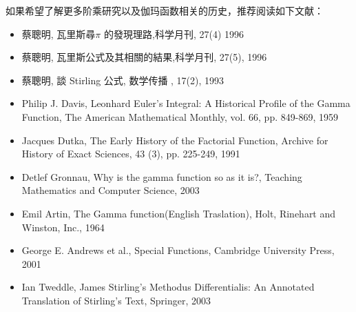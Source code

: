 如果希望了解更多阶乘研究以及伽玛函数相关的历史，推荐阅读如下文献：
\begin{itemize}
\item 蔡聰明, 瓦里斯尋$\pi$ 的發現理路,科学月刊, 27(4) 1996
\item 蔡聰明, 瓦里斯公式及其相關的結果,科学月刊, 27(5), 1996 
\item 蔡聰明, 談 Stirling 公式, 数学传播 , 17(2), 1993
\item Philip J. Davis, Leonhard Euler's Integral: A Historical Profile of the Gamma Function, The American Mathematical Monthly, vol. 66, pp. 849-869, 1959 
\item Jacques Dutka, The Early History of the Factorial Function, Archive for History of Exact Sciences, 43 (3), pp. 225-249, 1991
\item Detlef Gronnau, Why is the gamma function so as it is?, Teaching Mathematics and Computer Science, 2003
\item Emil Artin, The Gamma function(English Traslation),  Holt, Rinehart and Winston, Inc., 1964
\item George E. Andrews et al., Special Functions, Cambridge University Press, 2001
\item Ian Tweddle, James Stirling's Methodus Differentialis: An Annotated Translation of Stirling's Text, Springer, 2003
\end{itemize}



